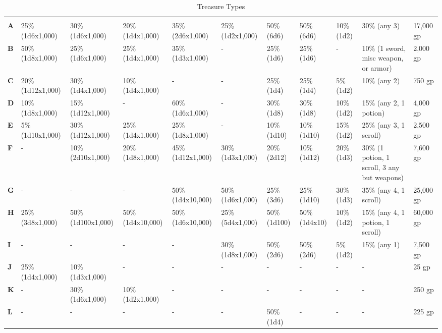 \begin {table}[H]
  \caption{Treasure Types}\label{tab:Treasure Types}
	\begin{tabularx}{\columnwidth}{>{\bfseries}M{.4in}M{.48in}M{.48in}M{.48in}M{.48in}M{.48in}M{.2in}M{.4in}M{.4in}YM{.45in}}
	 &  &  &  &  &  &  &  &  &  & \\
	A & 25\% (1d6x1,000) & 30\% (1d6x1,000) & 20\% (1d4x1,000) & 35\% (2d6x1,000) & 25\% (1d2x1,000) & 50\% (6d6) & 50\% (6d6) & 10\% (1d2) & 30\% (any 3) & 17,000 gp\\
	B & 50\% (1d8x1,000) & 25\% (1d6x1,000) & 25\% (1d4x1,000) & 35\% (1d3x1,000) & - & 25\% (1d6) & 25\% (1d6) & - & 10\% (1 sword, misc weapon, or armor) & 2,000 gp\\
	C & 20\% (1d12x1,000) & 30\% (1d4x1,000) & 10\% (1d4x1,000) & - & - & 25\% (1d4) & 25\% (1d4) & 5\% (1d2) & 10\% (any 2) & 750 gp\\
	D & 10\% (1d8x1,000) & 15\% (1d12x1,000) & - & 60\% (1d6x1,000) & - & 30\% (1d8) & 30\% (1d8) & 10\% (1d2) & 15\% (any 2, 1 potion) & 4,000 gp\\
	E & 5\% (1d10x1,000) & 30\% (1d12x1,000) & 25\% (1d4x1,000) & 25\% (1d8x1,000) & - & 10\% (1d10) & 10\% (1d10) & 15\% (1d2) & 25\% (any 3, 1 scroll) & 2,500 gp\\
	F & - & 10\% (2d10x1,000) & 20\% (1d8x1,000) & 45\% (1d12x1,000) & 30\% (1d3x1,000) & 20\% (2d12) & 10\% (1d12) & 20\% (1d3) & 30\% (1 potion, 1 scroll, 3 any but weapons) & 7,600 gp\\
	G & - & - & - & 50\% (1d4x10,000) & 50\% (1d6x1,000) & 25\% (3d6) & 25\% (1d10) & 30\% (1d3) & 35\% (any 4, 1 scroll) & 25,000 gp\\
	H & 25\% (3d8x1,000) & 50\% (1d100x1,000) & 50\% (1d4x10,000) & 50\% (1d6x10,000) & 25\% (5d4x1,000) & 50\% (1d100) & 50\% (1d4x10) & 10\% (1d2) & 15\% (any 4, 1 potion, 1 scroll) & 60,000 gp\\
	I & - & - & - & - & 30\% (1d8x1,000) & 50\% (2d6) & 50\% (2d6) & 5\% (1d2) & 15\% (any 1) & 7,500 gp\\
	J & 25\% (1d4x1,000) & 10\% (1d3x1,000) & - & - & - & - & - & - & - & 25 gp\\
	K & - & 30\% (1d6x1,000) & 10\% (1d2x1,000) & - & - & - & - & - & - & 250 gp\\
	L & - & - & - & - & - & 50\% (1d4) & - & - & - & 225 gp\\

\end{tabularx}
\end{table}
